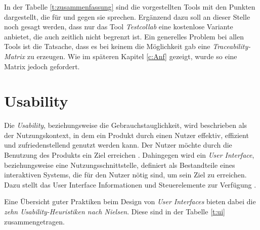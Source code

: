 \documentclass[11pt,a4paper]{report}
\begin{document}
In der Tabelle \ref{t:zusammenfassung} sind die vorgestellten Tools mit den Punkten dargestellt, die für und gegen sie sprechen. Ergänzend dazu soll an dieser Stelle noch gesagt werden, dass nur das Tool \textit{Testcollab} eine kostenlose Variante anbietet, die auch zeitlich nicht begrenzt ist. Ein generelles Problem bei allen Tools ist die Tatsache, dass es bei keinem die Möglichkeit gab eine \textit{Traceability-Matrix} zu erzeugen. Wie im späteren Kapitel \ref{c:Anf} gezeigt, wurde so eine Matrix jedoch gefordert.


\section{Usability}

Die \textit{Usability}, beziehungsweise die Gebrauchstauglichkeit, wird beschrieben als
der Nutzungskontext, in dem ein Produkt durch einen Nutzer effektiv, effizient und zufriedenstellend genutzt werden kann. Der Nutzer möchte durch die Benutzung des Produkts ein Ziel erreichen \cite{isousa}. Dahingegen wird ein \textit{User Interface}, beziehungsweise eine Nutzungsschnittstelle, definiert als Bestandteile eines interaktiven Systems, die für den Nutzer nötig sind, um sein Ziel zu erreichen. Dazu stellt das User Interface Informationen und Steuerelemente zur Verfügung \cite{isoui}.

Eine Übersicht guter Praktiken beim Design von \textit{User Interfaces} bieten dabei die \textit{zehn Usability-Heuristiken nach Nielsen}. Diese sind in der Tabelle \ref{t:ui} zusammengetragen.
\end{document}
